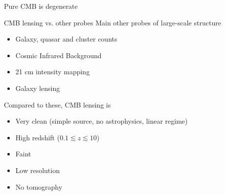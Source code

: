\documentclass[table]{beamer}
\begin{document}
\begin{frame}{Pure CMB is degenerate}
\begin{center}
	\end{center}
\end{frame}

\begin{frame}{CMB lensing vs. other probes}
	Main other probes of large-scale structure
	\begin{itemize}
		\item Galaxy, quasar and cluster counts
		\item Cosmic Infrared Background
		\item 21 cm intensity mapping
		\item Galaxy lensing
	\end{itemize}
	Compared to these, CMB lensing is
	\begin{itemize}
		\item Very clean (simple source, no astrophysics, linear regime)
		\item High redshift ($0.1\lesssim z\lesssim 10$)
		\item Faint
		\item Low resolution
		\item No tomography
	\end{itemize}
\end{frame}
\end{document}
